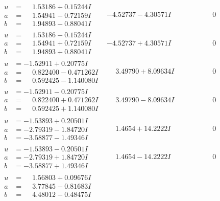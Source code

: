 \documentclass[1p]{elsarticle_modified}
\theoremstyle{definition}
\begin{document}
$$\begin{array}{c|c|c}
\begin{aligned}
u &= \phantom{-}1.53186 + 0.15244 I \\
a &= \phantom{-}1.54941 - 0.72159 I \\
b &= \phantom{-}1.94893 - 0.88041 I\end{aligned}
 & -4.52737 - 4.30571 I & \phantom{-0.000000 } 0 \\ \hline\begin{aligned}
u &= \phantom{-}1.53186 - 0.15244 I \\
a &= \phantom{-}1.54941 + 0.72159 I \\
b &= \phantom{-}1.94893 + 0.88041 I\end{aligned}
 & -4.52737 + 4.30571 I & \phantom{-0.000000 } 0 \\ \hline\begin{aligned}
u &= -1.52911 + 0.20775 I \\
a &= \phantom{-}0.822400 - 0.471262 I \\
b &= \phantom{-}0.592425 - 1.140080 I\end{aligned}
 & \phantom{-}3.49790 + 8.09634 I & \phantom{-0.000000 } 0 \\ \hline\begin{aligned}
u &= -1.52911 - 0.20775 I \\
a &= \phantom{-}0.822400 + 0.471262 I \\
b &= \phantom{-}0.592425 + 1.140080 I\end{aligned}
 & \phantom{-}3.49790 - 8.09634 I & \phantom{-0.000000 } 0 \\ \hline\begin{aligned}
u &= -1.53893 + 0.20501 I \\
a &= -2.79319 - 1.84720 I \\
b &= -3.58877 - 1.49346 I\end{aligned}
 & \phantom{-}1.4654 + 14.2222 I & \phantom{-0.000000 } 0 \\ \hline\begin{aligned}
u &= -1.53893 - 0.20501 I \\
a &= -2.79319 + 1.84720 I \\
b &= -3.58877 + 1.49346 I\end{aligned}
 & \phantom{-}1.4654 - 14.2222 I & \phantom{-0.000000 } 0 \\ \hline\begin{aligned}
u &= \phantom{-}1.56803 + 0.09676 I \\
a &= \phantom{-}3.77845 - 0.81683 I \\
b &= \phantom{-}4.48012 - 0.48475 I\end{aligned}

\end{array}$$
\end{document}
